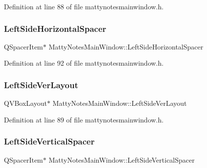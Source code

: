 Definition at line 88 of file mattynotesmainwindow.\+h.

\hypertarget{classMattyNotesMainWindow_ae4d4ea6fec42e10eab167f457116fdf0}{}\label{classMattyNotesMainWindow_ae4d4ea6fec42e10eab167f457116fdf0} 
\subsubsection{\texorpdfstring{Left\+Side\+Horizontal\+Spacer}{LeftSideHorizontalSpacer}}
{\footnotesize\ttfamily Q\+Spacer\+Item$\ast$ Matty\+Notes\+Main\+Window\+::\+Left\+Side\+Horizontal\+Spacer\hspace{0.3cm}{\ttfamily [private]}}



Definition at line 92 of file mattynotesmainwindow.\+h.

\hypertarget{classMattyNotesMainWindow_a4f9dc9be365bc7f2565f0c50c9a11be5}{}\label{classMattyNotesMainWindow_a4f9dc9be365bc7f2565f0c50c9a11be5} 
\subsubsection{\texorpdfstring{Left\+Side\+Ver\+Layout}{LeftSideVerLayout}}
{\footnotesize\ttfamily Q\+V\+Box\+Layout$\ast$ Matty\+Notes\+Main\+Window\+::\+Left\+Side\+Ver\+Layout\hspace{0.3cm}{\ttfamily [private]}}



Definition at line 89 of file mattynotesmainwindow.\+h.

\hypertarget{classMattyNotesMainWindow_ab70a06df9c479aa5e6d0a3e8f8b266e1}{}\label{classMattyNotesMainWindow_ab70a06df9c479aa5e6d0a3e8f8b266e1} 
\subsubsection{\texorpdfstring{Left\+Side\+Vertical\+Spacer}{LeftSideVerticalSpacer}}
{\footnotesize\ttfamily Q\+Spacer\+Item$\ast$ Matty\+Notes\+Main\+Window\+::\+Left\+Side\+Vertical\+Spacer\hspace{0.3cm}{\ttfamily [private]}}



